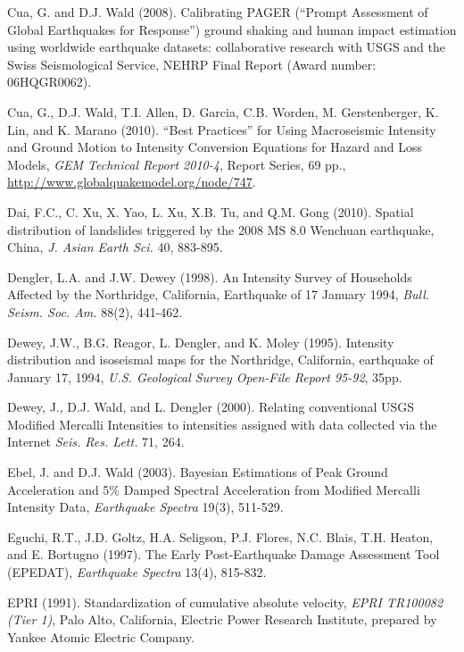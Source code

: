 \documentclass[letterpaper,10pt,english]{sphinxmanual}
\begin{document}
Cua, G. and D.J. Wald (2008). Calibrating PAGER (``Prompt Assessment of Global Earthquakes for
Response'') ground shaking and human impact estimation using worldwide earthquake datasets:
collaborative research with USGS and the Swiss Seismological Service, NEHRP Final Report (Award
number: 06HQGR0062).

Cua, G., D.J. Wald, T.I. Allen, D. Garcia, C.B. Worden, M. Gerstenberger, K. Lin, and K. Marano
(2010).  ``Best Practices'' for Using Macroseismic Intensity and Ground Motion to Intensity
Conversion Equations for Hazard and Loss Models, \emph{GEM Technical Report 2010-4}, Report Series,
69 pp., \url{http://www.globalquakemodel.org/node/747}.

\label{references:dai2010}
Dai, F.C., C. Xu, X. Yao, L. Xu, X.B. Tu, and Q.M. Gong (2010). Spatial distribution of
landslides triggered by the 2008 MS 8.0 Wenchuan earthquake, China, \emph{J. Asian Earth Sci.} 40,
883-895.

\label{references:dengler1998}
Dengler, L.A. and J.W. Dewey (1998). An Intensity Survey of Households Affected by the
Northridge, California, Earthquake of 17 January 1994, \emph{Bull. Seism. Soc. Am.} 88(2), 441-462.

\label{references:dewey1995}
Dewey, J.W., B.G. Reagor, L. Dengler, and K. Moley (1995). Intensity distribution and
isoseismal maps for the Northridge, California, earthquake of January 17, 1994, \emph{U.S.
Geological Survey Open-File Report 95-92}, 35pp.

\label{references:dewey2000}
Dewey, J., D.J. Wald, and L. Dengler (2000). Relating conventional USGS Modified Mercalli
Intensities to intensities assigned with data collected via the Internet \emph{Seis. Res. Lett.} 71, 264.

\label{references:ebel2003}
Ebel, J. and D.J. Wald (2003). Bayesian Estimations of Peak Ground Acceleration and 5\% Damped
Spectral Acceleration from Modified Mercalli Intensity Data, \emph{Earthquake Spectra} 19(3), 511-529.

Eguchi, R.T., J.D. Goltz, H.A. Seligson, P.J. Flores, N.C. Blais, T.H. Heaton, and
E. Bortugno (1997).  The Early Post-Earthquake Damage Assessment Tool (EPEDAT), \emph{Earthquake
Spectra} 13(4), 815-832.

\label{references:epri1991}
EPRI (1991). Standardization of cumulative absolute velocity, \emph{EPRI TR100082 (Tier 1)}, Palo Alto,
California, Electric Power Research Institute, prepared by Yankee Atomic Electric Company.
\end{document}
